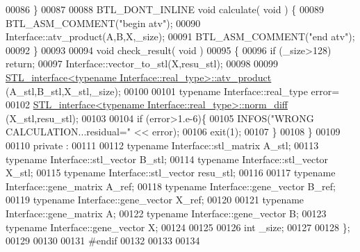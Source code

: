 \begin{DoxyCode}
00086   \}
00087 
00088   BTL\_DONT\_INLINE \textcolor{keywordtype}{void} calculate( \textcolor{keywordtype}{void} ) \{
00089     BTL\_ASM\_COMMENT(\textcolor{stringliteral}{"begin atv"});
00090     Interface::atv\_product(A,B,X,\_size);
00091     BTL\_ASM\_COMMENT(\textcolor{stringliteral}{"end atv"});
00092   \}
00093 
00094   \textcolor{keywordtype}{void} check\_result( \textcolor{keywordtype}{void} )
00095   \{
00096     \textcolor{keywordflow}{if} (\_size>128) \textcolor{keywordflow}{return};
00097     Interface::vector\_to\_stl(X,resu\_stl);
00098 
00099     \hyperlink{class_s_t_l__interface}{STL\_interface<typename Interface::real\_type>::atv\_product}
      (A\_stl,B\_stl,X\_stl,\_size);
00100 
00101     \textcolor{keyword}{typename} Interface::real\_type error=
00102       \hyperlink{class_s_t_l__interface}{STL\_interface<typename Interface::real\_type>::norm\_diff}
      (X\_stl,resu\_stl);
00103 
00104     \textcolor{keywordflow}{if} (error>1.e-6)\{
00105       INFOS(\textcolor{stringliteral}{"WRONG CALCULATION...residual="} << error);
00106       exit(1);
00107     \}
00108   \}
00109 
00110 private :
00111 
00112   \textcolor{keyword}{typename} Interface::stl\_matrix A\_stl;
00113   \textcolor{keyword}{typename} Interface::stl\_vector B\_stl;
00114   \textcolor{keyword}{typename} Interface::stl\_vector X\_stl;
00115   \textcolor{keyword}{typename} Interface::stl\_vector resu\_stl;
00116 
00117   \textcolor{keyword}{typename} Interface::gene\_matrix A\_ref;
00118   \textcolor{keyword}{typename} Interface::gene\_vector B\_ref;
00119   \textcolor{keyword}{typename} Interface::gene\_vector X\_ref;
00120 
00121   \textcolor{keyword}{typename} Interface::gene\_matrix A;
00122   \textcolor{keyword}{typename} Interface::gene\_vector B;
00123   \textcolor{keyword}{typename} Interface::gene\_vector X;
00124 
00125 
00126   \textcolor{keywordtype}{int} \_size;
00127 
00128 \};
00129 
00130 
00131 \textcolor{preprocessor}{#endif}
00132 
00133 
00134 
\end{DoxyCode}
